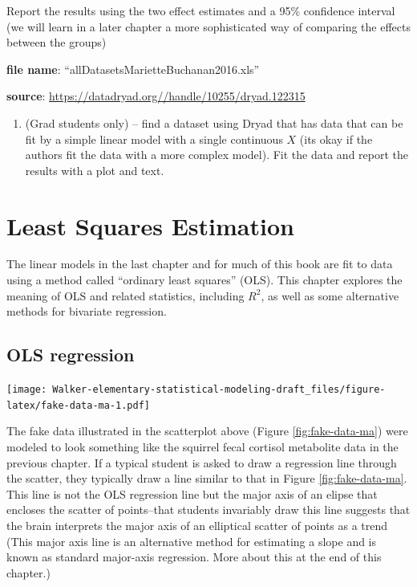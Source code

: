 \documentclass[]{book}
\providecommand{\tightlist}{%
  \setlength{\itemsep}{0pt}\setlength{\parskip}{0pt}}
\theoremstyle{definition}
\theoremstyle{definition}
\theoremstyle{definition}
\theoremstyle{remark}
\begin{document}
Report the results using the two effect estimates and a 95\% confidence
interval (we will learn in a later chapter a more sophisticated way of
comparing the effects between the groups)

\textbf{file name}: ``allDatasetsMarietteBuchanan2016.xls''

\textbf{source}: \url{https://datadryad.org//handle/10255/dryad.122315}

\begin{enumerate}
\def\labelenumi{\arabic{enumi}.}
\setcounter{enumi}{1}
\tightlist
\item
  (Grad students only) -- find a dataset using Dryad that has data that
  can be fit by a simple linear model with a single continuous \(X\)
  (its okay if the authors fit the data with a more complex model). Fit
  the data and report the results with a plot and text.
\end{enumerate}

\chapter{Least Squares Estimation}\label{least-squares-estimation}

The linear models in the last chapter and for much of this book are fit
to data using a method called ``ordinary least squares'' (OLS). This
chapter explores the meaning of OLS and related statistics, including
\(R^2\), as well as some alternative methods for bivariate regression.

\section{OLS regression}\label{ols-regression}

\texttt{[image: Walker-elementary-statistical-modeling-draft\_files/figure-latex/fake-data-ma-1.pdf]}

The fake data illustrated in the scatterplot above (Figure
\ref{fig:fake-data-ma}) were modeled to look something like the squirrel
fecal cortisol metabolite data in the previous chapter. If a typical
student is asked to draw a regression line through the scatter, they
typically draw a line similar to that in Figure \ref{fig:fake-data-ma}.
This line is not the OLS regression line but the major axis of an elipse
that encloses the scatter of points--that students invariably draw this
line suggests that the brain interprets the major axis of an elliptical
scatter of points as a trend (This major axis line is an alternative
method for estimating a slope and is known as standard major-axis
regression. More about this at the end of this chapter.)
\end{document}
